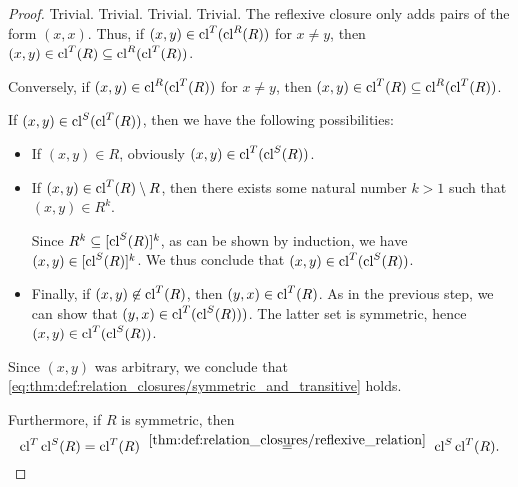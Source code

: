 \begin{proof}
   Trivial.
   Trivial.
   Trivial.
   Trivial.
   The reflexive closure only adds pairs of the form \( (x, x) \). Thus, if \( (x, y) \in \operatorname{cl}^T(\operatorname{cl}^R(R)) \) for \( x \neq y \), then \( (x, y) \in \operatorname{cl}^T(R) \subseteq \operatorname{cl}^R(\operatorname{cl}^T(R)) \).

  Conversely, if \( (x, y) \in \operatorname{cl}^R(\operatorname{cl}^T(R)) \) for \( x \neq y \), then \( (x, y) \in \operatorname{cl}^T(R) \subseteq \operatorname{cl}^R(\operatorname{cl}^T(R)) \).

   If \( (x, y) \in \operatorname{cl}^S(\operatorname{cl}^T(R)) \), then we have the following possibilities:
  \begin{itemize}
    \item If \( (x, y) \in R \), obviously \( (x, y) \in \operatorname{cl}^T(\operatorname{cl}^S(R)) \).
    \item If \( (x, y) \in \operatorname{cl}^T(R) \setminus R \), then there exists some natural number \( k > 1 \) such that \( (x, y) \in R^k \).

    Since \( R^k \subseteq [\operatorname{cl}^S(R)]^k \), as can be shown by induction, we have \( (x, y) \in [\operatorname{cl}^S(R)]^k \). We thus conclude that \( (x, y) \in \operatorname{cl}^T(\operatorname{cl}^S(R)) \).

    \item Finally, if \( (x, y) \not\in \operatorname{cl}^T(R) \), then \( (y, x) \in \operatorname{cl}^T(R) \). As in the previous step, we can show that \( (y, x) \in \operatorname{cl}^T(\operatorname{cl}^S(R))) \). The latter set is symmetric, hence \( (x, y) \in \operatorname{cl}^T(\operatorname{cl}^S(R)) \).
  \end{itemize}

  Since \( (x, y) \) was arbitrary, we conclude that \eqref{eq:thm:def:relation_closures/symmetric_and_transitive} holds.

  Furthermore, if \( R \) is symmetric, then
  \begin{equation*}
    \cl^T \cl^S(R)
    =
    \cl^T(R)
    \reloset {\ref{thm:def:relation_closures/reflexive_relation}} =
    \cl^S \cl^T(R).
  \end{equation*}
\end{proof}

